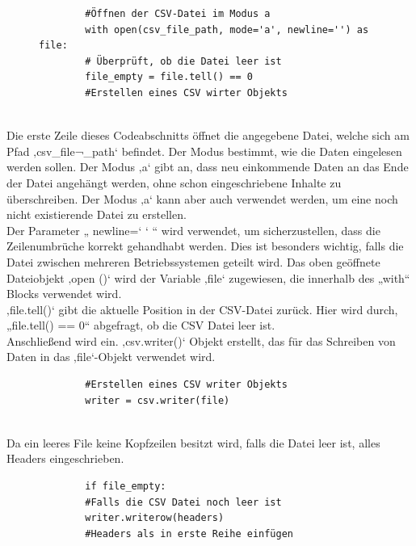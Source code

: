 \vspace{3mm}
\begin{figure}[H]
	\centering
	\begin{verbatim}
		#Öffnen der CSV-Datei im Modus a
		with open(csv_file_path, mode='a', newline='') as file:
		# Überprüft, ob die Datei leer ist
		file_empty = file.tell() == 0
		#Erstellen eines CSV wirter Objekts
		
	\end{verbatim}
\end{figure}
Die erste Zeile dieses Codeabschnitts öffnet die angegebene Datei, welche sich am Pfad ‚csv\_file¬\_path‘ befindet. Der Modus bestimmt, wie die Daten eingelesen werden sollen. Der Modus ‚a‘ gibt an, dass neu einkommende Daten an das Ende der Datei angehängt werden, ohne schon eingeschriebene Inhalte zu überschreiben. Der Modus ‚a‘ kann aber auch verwendet werden, um eine noch nicht existierende Datei zu erstellen. \\
\newpage
Der Parameter „ newline=‘ ‘ “ wird verwendet, um sicherzustellen, dass die Zeilenumbrüche korrekt gehandhabt werden. Dies ist besonders wichtig, falls die Datei zwischen mehreren Betriebssystemen geteilt wird. Das oben geöffnete Dateiobjekt ‚open ()‘ wird der Variable ‚file‘ zugewiesen, die innerhalb des „with“ Blocks verwendet wird.\\
\vspace{3mm}
‚file.tell()‘ gibt die aktuelle Position in der CSV-Datei zurück. Hier wird durch, „file.tell() == 0“ abgefragt, ob die CSV Datei leer ist.\\
\vspace{3mm}
Anschließend wird ein. ‚csv.writer()‘ Objekt erstellt, das für das Schreiben von Daten in das ‚file‘-Objekt verwendet wird.
\vspace{3mm}
\begin{figure}[H]
	\centering
	\begin{verbatim}
		#Erstellen eines CSV writer Objekts
		writer = csv.writer(file)
		
	\end{verbatim}
\end{figure}
Da ein leeres File keine Kopfzeilen besitzt wird, falls die Datei leer ist, alles Headers eingeschrieben.
\vspace{3mm} 
\begin{figure}[H]
	\centering
	\begin{verbatim}
		if file_empty: 
		#Falls die CSV Datei noch leer ist
		writer.writerow(headers) 
		#Headers als in erste Reihe einfügen
	\end{verbatim}
\end{figure}
